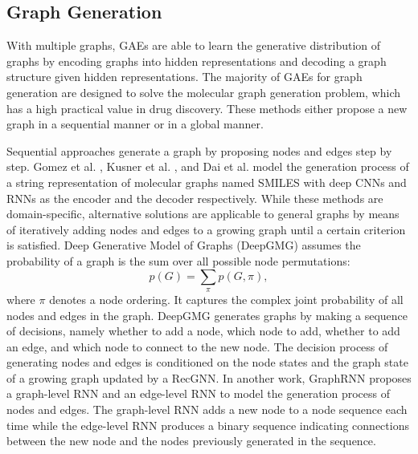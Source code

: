 	\subsection{Graph Generation}
	With multiple graphs, GAEs are able to learn the generative distribution of graphs by encoding graphs into hidden representations and decoding a graph structure given hidden representations. The majority of GAEs for graph generation are designed to solve the molecular graph generation problem, which has a high practical value in drug discovery. These methods either propose a new graph in a sequential manner or in a global manner.  
	
	Sequential approaches generate a graph by proposing nodes and edges step by step. Gomez et al. \cite{gomez2018automatic}, Kusner et al. \cite{kusner2017grammar}, and Dai et al. \cite{dai2018syntax} model the generation process of a string representation of molecular graphs named SMILES with deep CNNs and RNNs as the encoder and the decoder respectively. While these methods are domain-specific, alternative solutions are applicable to general graphs by means of iteratively adding nodes and edges to a growing graph until a certain criterion is satisfied.  
	Deep Generative Model of Graphs (DeepGMG) \cite{li2018learning}
	assumes the probability of a graph is the sum over all possible node permutations:
	\begin{equation}
	    p(G)=\sum_\pi p(G,\pi),
	\end{equation}
	where $\pi$ denotes a node ordering. It captures the complex joint probability of all nodes and edges in the graph.
	DeepGMG generates graphs by making a sequence of decisions, namely whether to add a node, which node to add, whether to add an edge, and which node to connect to the new node. The decision process of generating nodes and edges is conditioned on the node states and the graph state of a growing graph updated by a RecGNN.  In another work, GraphRNN \cite{you2018graphrnn} proposes a graph-level RNN and an edge-level RNN to model the generation process of nodes and edges.
    The graph-level RNN adds a new node to a node sequence each time while the edge-level RNN produces a binary sequence indicating connections between the new node and the nodes previously generated in the sequence. 
    
    
